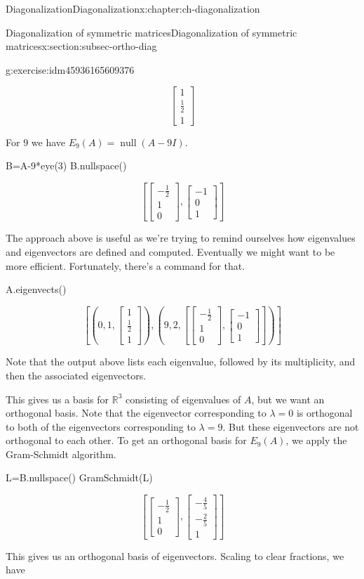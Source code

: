 \documentclass[oneside,10pt,]{book}
\numberwithin{equation}{section}
\newcommand{\bbm}{\begin{bmatrix}}
\newcommand{\ebm}{\end{bmatrix}}
\newcommand{\R}{\mathbb{R}}
\newcommand{\nll}{\operatorname{null}}
\begin{document}
\begin{chapterptx}{Diagonalization}{}{Diagonalization}{}{}{x:chapter:ch-diagonalization}
\begin{sectionptx}{Diagonalization of symmetric matrices}{}{Diagonalization of symmetric matrices}{}{}{x:section:subsec-ortho-diag}
\begin{inlineexercise}{}{g:exercise:idm45936165609376}
\begin{sageoutput}
\[\bbm 1\\ \frac12\\1\ebm\]
\end{sageoutput}
For \(9\) we have \(E_9(A) = \nll(A-9I)\).%
\begin{sageinput}
B=A-9*eye(3)
B.nullspace()
\end{sageinput}
\begin{sageoutput}
\[\left[\bbm -\frac12\\1\\0\ebm, \bbm -1\\0\\1\ebm\right]\]
\end{sageoutput}
The approach above is useful as we're trying to remind ourselves how eigenvalues and eigenvectors are defined and computed. Eventually we might want to be more efficient. Fortunately, there's a command for that.%
\begin{sageinput}
A.eigenvects()
\end{sageinput}
\begin{sageoutput}
\[\left[\left(0,1,\bbm 1\\ \frac12\\1\ebm\right), \left(9,2,\left[\bbm -\frac12\\1\\0\ebm,\bbm -1\\0\\1\ebm\right]\right)\right]\]
\end{sageoutput}
Note that the output above lists each eigenvalue, followed by its multiplicity, and then the associated eigenvectors.%
\par
This gives us a basis for \(\R^3\) consisting of eigenvalues of \(A\), but we want an orthogonal basis. Note that the eigenvector corresponding to \(\lambda = 0\) is orthogonal to both of the eigenvectors corresponding to \(\lambda =9\). But these eigenvectors are not orthogonal to each other. To get an orthogonal basis for \(E_9(A)\), we apply the Gram-Schmidt algorithm.%
\begin{sageinput}
L=B.nullspace()
GramSchmidt(L)
\end{sageinput}
\begin{sageoutput}
\[\left[\bbm -\frac12\\1\\0\ebm, \bbm -\frac45\\-\frac25\\1\ebm\right]\]
\end{sageoutput}
This gives us an orthogonal basis of eigenvectors. Scaling to clear fractions, we have%

\end{inlineexercise}
\end{sectionptx}
\end{chapterptx}
\end{document}
